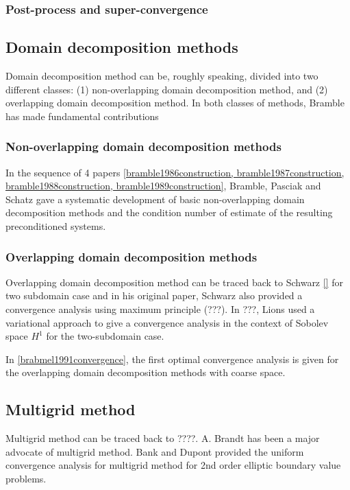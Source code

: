 \documentclass[CJK,11pt]{amsart}
\theoremstyle{definition}
\begin{document}
\begin{CJK*}{UTF8}{gbsn}
\subsubsection{Post-process and super-convergence}


\subsection{Domain decomposition methods}
Domain decomposition method can be, roughly speaking, divided into two different classes: (1) non-overlapping domain decomposition method, and (2) overlapping domain decomposition method.  In both classes of methods, Bramble has made fundamental contributions

\subsubsection{Non-overlapping domain decomposition methods}
In the sequence of 4 papers \eqref{bramble1986construction, bramble1987construction, bramble1988construction, bramble1989construction}, Bramble, Pasciak and Schatz gave a systematic development of basic non-overlapping domain decomposition methods and the condition number of estimate of the resulting preconditioned systems. 

\subsubsection{Overlapping domain decomposition methods}
Overlapping domain decomposition method can be traced back to Schwarz \eqref{} for two subdomain case and in his original paper, Schwarz also provided a convergence analysis using maximum principle (???).  In ???, Lions used a variational approach to give a convergence analysis in the context of Sobolev space $H^1$ for the two-subdomain case.

In \eqref{brabmel1991convergence}, the first optimal convergence analysis is given for the overlapping domain decomposition methods with coarse space. 

\subsection{Multigrid method}
Multigrid method can be traced back to ????.  A. Brandt has been a major advocate of multigrid method.  Bank and Dupont provided the uniform convergence analysis for multigrid method for 2nd order elliptic boundary value problems. 


\end{CJK*}
\end{document}
